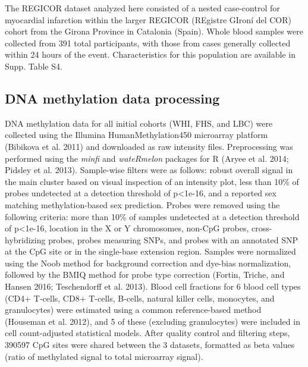\documentclass[]{article}
\begin{document}
The REGICOR dataset analyzed here consisted of a nested case-control for
myocardial infarction within the larger REGICOR (REgistre GIroní del
COR) cohort from the Girona Province in Catalonia (Spain). Whole blood
samples were collected from 391 total participants, with those from
cases generally collected within 24 hours of the event. Characteristics
for this population are available in Supp. Table S4.

\hypertarget{dna-methylation-data-processing}{%
\subsection{DNA methylation data
processing}\label{dna-methylation-data-processing}}

DNA methylation data for all initial cohorts (WHI, FHS, and LBC) were
collected using the Illumina HumanMethylation450 microarray platform
(Bibikova et al. 2011) and downloaded as raw intensity files.
Preprocessing was performed using the \emph{minfi} and \emph{wateRmelon}
packages for R (Aryee et al. 2014; Pidsley et al. 2013). Sample-wise
filters were as follows: robust overall signal in the main cluster based
on visual inspection of an intensity plot, less than 10\% of probes
undetected at a detection threshold of p\textless{}1e-16, and a reported
sex matching methylation-based sex prediction. Probes were removed using
the following criteria: more than 10\% of samples undetected at a
detection threshold of p\textless{}1e-16, location in the X or Y
chromosomes, non-CpG probes, cross-hybridizing probes, probes measuring
SNPs, and probes with an annotated SNP at the CpG site or in the
single-base extension region. Samples were normalized using the Noob
method for background correction and dye-bias normalization, followed by
the BMIQ method for probe type correction (Fortin, Triche, and Hansen
2016; Teschendorff et al. 2013). Blood cell fractions for 6 blood cell
types (CD4+ T-cells, CD8+ T-cells, B-cells, natural killer cells,
monocytes, and granulocytes) were estimated using a common
reference-based method (Houseman et al. 2012), and 5 of these (excluding
granulocytes) were included in cell count-adjusted statistical models.
After quality control and filtering steps, 390597 CpG sites were shared
between the 3 datasets, formatted as beta values (ratio of methylated
signal to total microarray signal).
\end{document}
